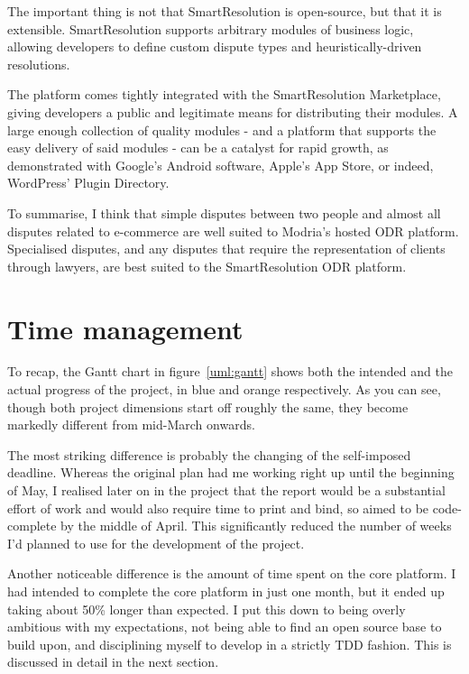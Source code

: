 The important thing is not that SmartResolution is open-source, but that it is extensible. SmartResolution supports arbitrary modules of business logic, allowing developers to define custom dispute types and heuristically-driven resolutions.

The platform comes tightly integrated with the SmartResolution Marketplace, giving developers a public and legitimate means for distributing their modules. A large enough collection of quality modules - and a platform that supports the easy delivery of said modules - can be a catalyst for rapid growth, as demonstrated with Google's Android software, Apple's App Store, or indeed, WordPress' Plugin Directory.

To summarise, I think that simple disputes between two people and almost all disputes related to e-commerce are well suited to Modria's hosted ODR platform. Specialised disputes, and any disputes that require the representation of clients through lawyers, are best suited to the SmartResolution ODR platform.

\section{Time management}

To recap, the Gantt chart in figure~\ref{uml:gantt} shows both the intended and the actual progress of the project, in blue and orange respectively. As you can see, though both project dimensions start off roughly the same, they become markedly different from mid-March onwards.

The most striking difference is probably the changing of the self-imposed deadline. Whereas the original plan had me working right up until the beginning of May, I realised later on in the project that the report would be a substantial effort of work and would also require time to print and bind, so aimed to be code-complete by the middle of April. This significantly reduced the number of weeks I'd planned to use for the development of the project.

Another noticeable difference is the amount of time spent on the core platform. I had intended to complete the core platform in just one month, but it ended up taking about 50\% longer than expected. I put this down to being overly ambitious with my expectations, not being able to find an open source base to build upon, and disciplining myself to develop in a strictly TDD fashion. This is discussed in detail in the next section.

